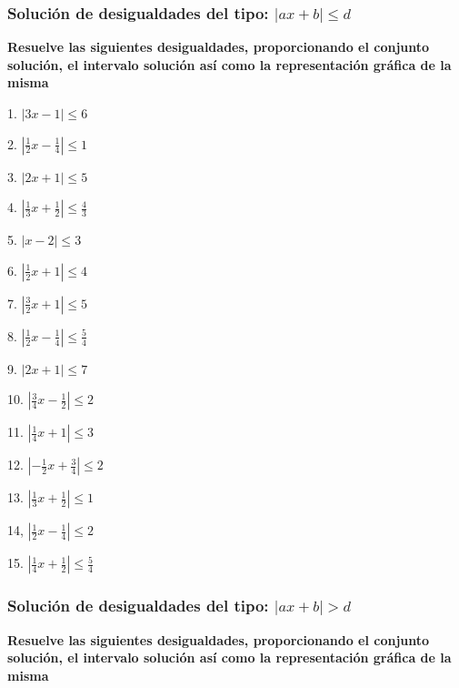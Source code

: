 \documentclass[12pt]{article}
\begin{document}
\subsubsection{\texorpdfstring{Solución de desigualdades del tipo:
\(|ax+b| \leq d\)}{Solución de desigualdades del tipo: \textbar ax+b\textbar{} \textbackslash leq d}}\label{soluciuxf3n-de-desigualdades-del-tipo-axb-leq-d}
\textbf{Resuelve las siguientes desigualdades, proporcionando el
conjunto solución, el intervalo solución así como la representación
gráfica de la misma}

\begin{multicols}{2}
1. $|3x-1|\leq 6$

2. $|\frac{1}{2}x-\frac{1}{4}|\leq 1$

3. $|2x+1|\leq 5$

4. $|\frac{1}{3}x+\frac{1}{2}|\leq \frac{4}{3}$

5. $|x-2|\leq 3$

6. $|\frac{1}{2}x+1|\leq 4$

7. $|\frac{3}{2}x+1|\leq 5$

8. $|\frac{1}{2}x-\frac{1}{4}|\leq \frac{5}{4}$

9. $|2x+1|\leq 7$

10. $|\frac{3}{4}x-\frac{1}{2}|\leq 2$

11. $|\frac{1}{4}x+1|\leq 3$

12. $|-\frac{1}{2}x+\frac{3}{4}|\leq 2$

13. $|\frac{1}{3}x+\frac{1}{2}|\leq 1$

14, $|\frac{1}{2}x-\frac{1}{4}|\leq 2$

15. $|\frac{1}{4}x+\frac{1}{2}|\leq \frac{5}{4}$

\end{multicols}

\subsubsection{\texorpdfstring{Solución de desigualdades del tipo:
\(|ax+b| >d\)}{Solución de desigualdades del tipo: \textbar ax+b\textbar{} \textgreater d}}\label{soluciuxf3n-de-desigualdades-del-tipo-axb-d-1}
\textbf{Resuelve las siguientes desigualdades, proporcionando el
conjunto solución, el intervalo solución así como la representación
gráfica de la misma}
\end{document}
